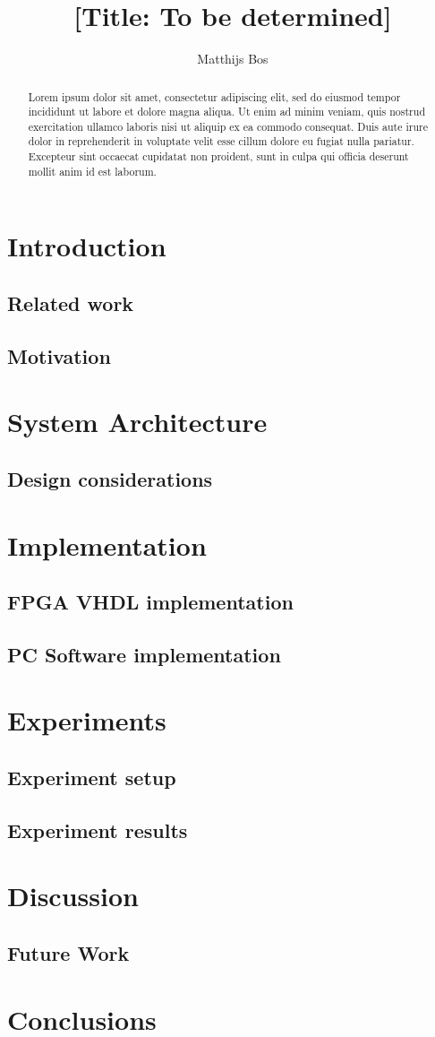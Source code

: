 \documentclass[singleside,openright]{uva-bachelor-thesis}
\title{[Title: To be determined]}
\author{Matthijs Bos}
\begin{document}
\maketitle

\begin{abstract}
Lorem ipsum dolor sit amet, consectetur adipiscing elit, sed do eiusmod tempor incididunt ut labore et dolore magna aliqua. Ut enim ad minim veniam, quis nostrud exercitation ullamco laboris nisi ut aliquip ex ea commodo consequat. Duis aute irure dolor in reprehenderit in voluptate velit esse cillum dolore eu fugiat nulla pariatur. Excepteur sint occaecat cupidatat non proident, sunt in culpa qui officia deserunt mollit anim id est laborum.
\end{abstract}

\tableofcontents

\chapter{Introduction}
\section{Related work}
\section{Motivation}

\chapter{System Architecture}
\section{Design considerations}


\chapter{Implementation}
\section{FPGA VHDL implementation}
\section{PC Software implementation}

\chapter{Experiments}
\section{Experiment setup}
\section{Experiment results}

\chapter{Discussion}
\section{Future Work}

\chapter{Conclusions}
\end{document}
